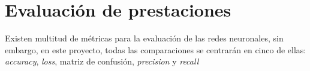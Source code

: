 \section{Evaluación de prestaciones} \label{sec.metricas}
Existen multitud de métricas para la evaluación de las redes neuronales, sin embargo, en este proyecto, todas las comparaciones se centrarán en cinco de ellas: \textit{accuracy}, \textit{loss}, matriz de confusión, \textit{precision} y \textit{recall} \cite{pullum2007guidance} 